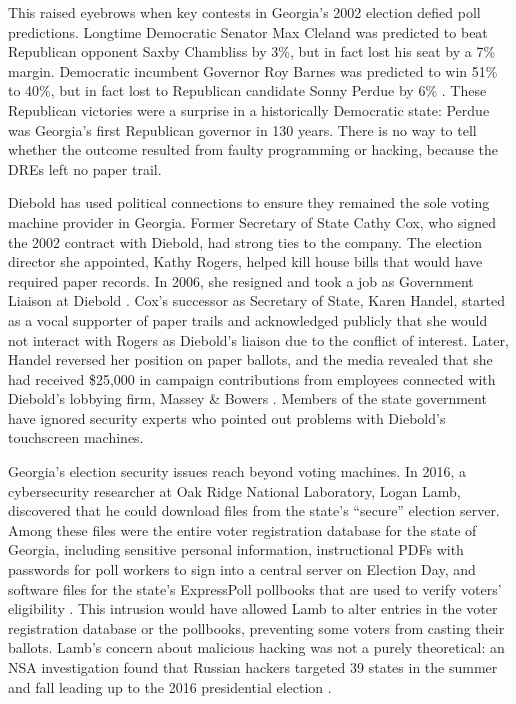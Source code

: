 \documentclass[runningheads]{llncs}
\begin{document}
This raised eyebrows when key contests in Georgia's 2002 election defied poll predictions.
Longtime Democratic Senator Max Cleland was predicted to beat Republican opponent Saxby Chambliss by 3\%,
but in fact lost his seat by a 7\% margin.
Democratic incumbent Governor Roy Barnes was predicted to win 51\% to 40\%, but in fact lost to Republican candidate
Sonny Perdue by 6\% \cite{freeman2006,peha_touch-and-go_2006}.
These Republican victories were a surprise in a historically Democratic state: 
Perdue was Georgia's first Republican governor in 130 years.
There is no way to tell whether the outcome resulted from faulty programming or hacking, because the DREs left no paper trail.

Diebold has used political connections to ensure they remained the sole voting machine provider in Georgia.
Former Secretary of State Cathy Cox, who signed the 2002 contract with Diebold, had strong ties
to the company.
The election director she appointed, Kathy Rogers, 
helped kill house bills that would have required paper records.
In 2006, she resigned and took a job as Government Liaison at Diebold \cite{augustachronicle_voting_2006}.
Cox's successor as Secretary of State, Karen Handel, started as a vocal supporter of paper trails and 
acknowledged publicly that she would not interact with Rogers as Diebold's liaison due to the conflict of interest.
Later, Handel reversed her position on paper ballots, 
and the media revealed that she had received
 \$25,000 in campaign contributions from employees connected with Diebold's lobbying firm, Massey \& Bowers \cite{voterga_georgia_2014}.
Members of the state government have ignored security experts who pointed out problems with Diebold's touchscreen machines.

Georgia's election security issues reach beyond voting machines.
In 2016, a cybersecurity researcher at Oak Ridge National Laboratory, Logan Lamb, 
discovered that he could download files from the state's ``secure'' election server.
Among these files were the entire voter registration database for the state of Georgia,
including sensitive personal information,
instructional PDFs with passwords for poll workers to sign into a central server on Election Day,
and software files for the state's ExpressPoll pollbooks that are used to verify voters' eligibility \cite{zetter_was_2018}.
This intrusion would have allowed Lamb to alter entries in the voter registration database or the pollbooks,
preventing some voters from casting their ballots.
Lamb's concern about malicious hacking was not a purely theoretical:
an NSA investigation found that Russian hackers targeted 39 states 
in the summer and fall leading up to the 2016 presidential election \cite{riley_russian_2017}.
\end{document}
